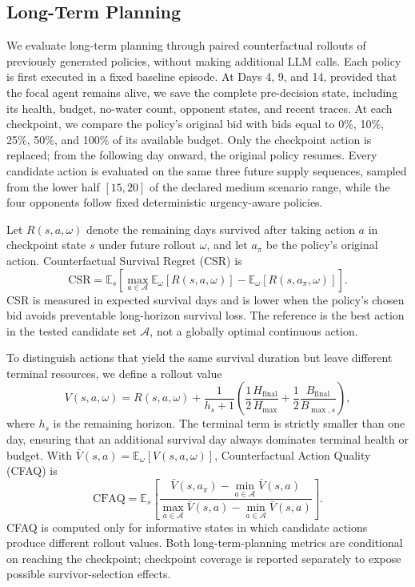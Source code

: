 \documentclass[letterpaper]{article} %
\begin{document}
\subsection{Long-Term Planning}

We evaluate long-term planning through paired counterfactual rollouts
of previously generated policies, without making additional LLM calls.
Each policy is first executed in a fixed baseline episode. At Days 4,
9, and 14, provided that the focal agent remains alive, we save the
complete pre-decision state, including its health, budget, no-water
count, opponent states, and recent traces. At each checkpoint, we
compare the policy's original bid with bids equal to 0\%, 10\%, 25\%,
50\%, and 100\% of its available budget. Only the checkpoint action is
replaced; from the following day onward, the original policy resumes.
Every candidate action is evaluated on the same three future supply
sequences, sampled from the lower half $[15,20]$ of the declared medium
scenario range, while the four opponents follow fixed deterministic
urgency-aware policies.

Let $R(s,a,\omega)$ denote the remaining days survived after taking
action $a$ in checkpoint state $s$ under future rollout $\omega$, and
let $a_\pi$ be the policy's original action. Counterfactual Survival
Regret (CSR) is
\begin{equation}
    \mathrm{CSR}
    =
    \mathbb{E}_{s}\!\left[
        \max_{a\in\mathcal{A}}
        \mathbb{E}_{\omega}[R(s,a,\omega)]
        -
        \mathbb{E}_{\omega}[R(s,a_\pi,\omega)]
    \right].
\end{equation}
CSR is measured in expected survival days and is lower when the policy's
chosen bid avoids preventable long-horizon survival loss. The reference
is the best action in the tested candidate set $\mathcal{A}$, not a
globally optimal continuous action.

To distinguish actions that yield the same survival duration but leave
different terminal resources, we define a rollout value
\begin{equation}
    V(s,a,\omega)
    =
    R(s,a,\omega)
    +
    \frac{1}{h_s+1}
    \left(
        \frac{1}{2}\frac{H_{\mathrm{final}}}{H_{\max}}
        +
        \frac{1}{2}\frac{B_{\mathrm{final}}}{B_{\max,s}}
    \right),
\end{equation}
where $h_s$ is the remaining horizon. The terminal term is strictly
smaller than one day, ensuring that an additional survival day always
dominates terminal health or budget. With
$\bar V(s,a)=\mathbb{E}_{\omega}[V(s,a,\omega)]$, Counterfactual Action
Quality (CFAQ) is
\begin{equation}
    \mathrm{CFAQ}
    =
    \mathbb{E}_{s}\!\left[
        \frac{\bar V(s,a_\pi)-\min_{a\in\mathcal{A}}\bar V(s,a)}
             {\max_{a\in\mathcal{A}}\bar V(s,a)-\min_{a\in\mathcal{A}}\bar V(s,a)}
    \right].
\end{equation}
CFAQ is computed only for informative states in which candidate actions
produce different rollout values. Both long-term-planning metrics are
conditional on reaching the checkpoint; checkpoint coverage is
reported separately to expose possible survivor-selection effects.
\end{document}
